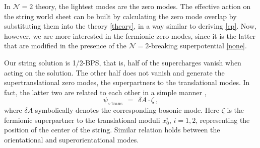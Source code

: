 \documentclass[12pt]{article}
\def\beq{\begin{equation}}
\def\eeq{\end{equation}}
\newcommand{\ntwo}{${\mathcal N}=2$ }
\newcommand{\ntwon}{${\mathcal N}=2$}
\begin{document}
	In \ntwo theory, the lightest modes are the zero modes. 
	The effective action on the string world sheet can be built by calculating the zero mode overlap 
	by substituting them into the theory \eqref{theory}, in a way similar to deriving \eqref{cp}.
	Now, however, we are more interested in the fermionic zero modes, since it is the latter that
	are modified in the presence of  the \ntwon-breaking superpotential \eqref{none}.

	Our string solution  is 1/2-BPS, that is, half of the supercharges vanish when acting on the solution.
	The other half does not vanish and generate the supertranslational zero modes, the superpartners 
	to the translational modes.
	In fact, the latter two are related to each other in a simple manner \cite{Edalati},
\beq
\label{bos_ferm_rel}
	\psi_{\text{s-trans}} ~~=~~  \delta A \cdot \zeta~,
\eeq
	where $ \delta A $ symbolically denotes the corresponding bosonic mode.
	Here $ \zeta $ is the 
	fermionic superpartner to the translational moduli $ x_0^i $, $ i = 1, 2 $, representing the position of the 
	center of the string.
	Similar relation holds between the orientational and superorientational modes.
\end{document}
